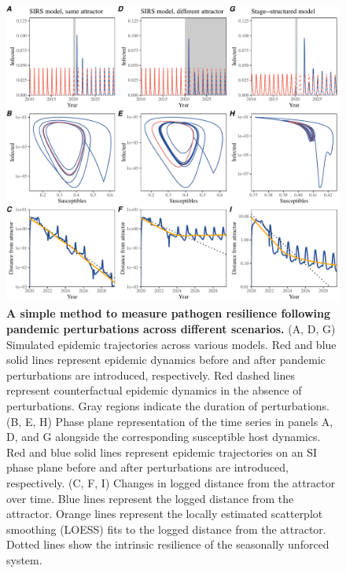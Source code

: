 \documentclass[12pt]{article}
\begin{document}
\begin{figure}[!th]
\includegraphics[width=\textwidth]{../figure2/figure2_simple.pdf}
\caption{
\textbf{A simple method to measure pathogen resilience following pandemic perturbations across different scenarios.}
(A, D, G) Simulated epidemic trajectories across various models. 
Red and blue solid lines represent epidemic dynamics before and after pandemic perturbations are introduced, respectively.
Red dashed lines represent counterfactual epidemic dynamics in the absence of perturbations.
Gray regions indicate the duration of perturbations.
(B, E, H) Phase plane representation of the time series in panels A, D, and G alongside the corresponding susceptible host dynamics.
Red and blue solid lines represent epidemic trajectories on an SI phase plane before and after perturbations are introduced, respectively.
(C, F, I) Changes in logged distance from the attractor over time.
Blue lines represent the logged distance from the attractor.
Orange lines represent the locally estimated scatterplot smoothing (LOESS) fits to the logged distance from the attractor.
Dotted lines show the intrinsic resilience of the seasonally unforced system.
}
\end{figure}
\end{document}
